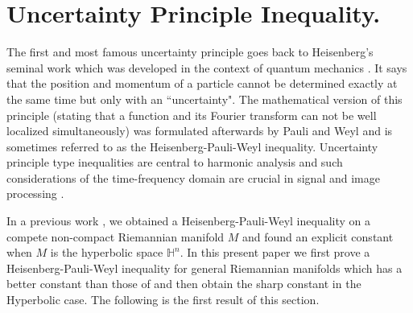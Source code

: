 \documentclass[12pt]{amsart}
\numberwithin{equation}{section}
\numberwithin{theorem}{section}
\numberwithin{theorem}{section} \numberwithin{lemma}{section}
\numberwithin{definition}{section}
\numberwithin{corollary}{section}
\numberwithin{remark}{section}
\numberwithin{proposition}{section}
\begin{document}
\section{Uncertainty Principle Inequality.}
The first and most famous uncertainty principle goes back to
Heisenberg's seminal work  which was developed in the context of
quantum mechanics \cite {Heisenberg}. It says that the position
and momentum of a particle cannot be determined exactly at the
same time but only with an ``uncertainty".  The mathematical
version of this principle (stating that a function and its Fourier
transform can not be well localized simultaneously) was formulated
afterwards by Pauli and Weyl \cite{Weyl} and is sometimes referred
to as the Heisenberg-Pauli-Weyl inequality. Uncertainty principle
type inequalities are  central to harmonic analysis and such
considerations of  the time-frequency domain are crucial in signal
and image processing \cite{Folland-Sitaram}.

In a previous work \cite{Kombe-Ozaydin},  we obtained a
Heisenberg-Pauli-Weyl inequality on a compete non-compact Riemannian
manifold $M$ and found an explicit constant when $M$ is
 the hyperbolic space $\mathbb{H}^n$. In this present paper we
first prove a Heisenberg-Pauli-Weyl inequality for general
Riemannian manifolds which has a better constant than those of
\cite{Kombe-Ozaydin} and then obtain the sharp constant in the
Hyperbolic case. The following is the first result of this section.
\end{document}

